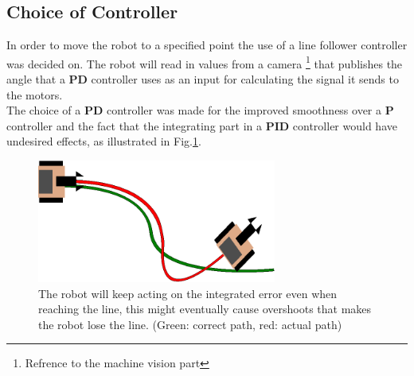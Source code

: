 \subsection{Choice of Controller} \label{sec:choice_of_cont}

In order to move the robot to a specified point the use of a line follower controller was decided on. The robot will read in values from a camera \footnote{Refrence to the machine vision part} that publishes the angle that a \textbf{PD} controller uses as an input for calculating the signal it sends to the motors.\\
\indent The choice of a \textbf{PD} controller was made for the improved smoothness over a \textbf{P} controller and the fact that the integrating part in a \textbf{PID} controller would have undesired effects, as illustrated in Fig.\ref{fig:PID_bad}. 

\begin{figure}[H]
    \centering
    \includegraphics[width=0.7\textwidth]{img/Pid_bad.eps}
    \caption{The robot will keep acting on the integrated error even when reaching the line, this might eventually cause overshoots that makes the robot lose the line. (Green: correct path, red: actual path)  }
    \label{fig:PID_bad}
\end{figure}
